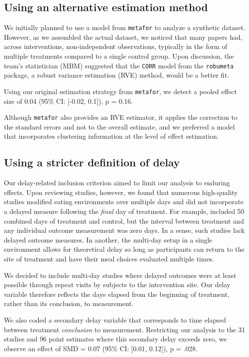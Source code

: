 \documentclass[sn-nature,referee,pdflatex]{sn-jnl}
\begin{document}
\subsection{Using an alternative estimation
method}\label{using-an-alternative-estimation-method}

We initially planned to use a model from \texttt{metafor} to analyze a
synthetic dataset. However, as we assembled the actual dataset, we
noticed that many papers had, across interventions, non-independent
observations, typically in the form of multiple treatments compared to a
single control group. Upon discussion, the team's statistician (MBM)
suggested that the \texttt{CORR} model from the \texttt{robumeta}
package, a robust variance estimation (RVE) method, would be a better
fit.

Using our original estimation strategy from \texttt{metafor}, we detect
a pooled effect size of 0.04 (95\% CI: {[}-0.02, 0.1{]}), p = 0.16.

Although \texttt{metafor} also provides an RVE estimator, it applies the
correction to the standard errors and not to the overall estimate, and
we preferred a model that incorporates clustering information at the
level of effect estimation.

\subsection{Using a stricter definition of
delay}\label{using-a-stricter-definition-of-delay}

Our delay-related inclusion criterion aimed to limit our analysis to
enduring effects. Upon reviewing studies, however, we found that
numerous high-quality studies modified eating environments over multiple
days and did not incorporate a delayed measure following the
\emph{final} day of treatment. For example, \citep{andersson2021}
included 50 combined days of treatment and control, but the interval
between treatment and any individual outcome measurement was zero days.
In a sense, such studies lack delayed outcome measures. In another, the
multi-day setup in a single environment allows for theoretical delay so
long as participants can return to the site of treatment and have their
meal choices evaluated multiple times.

We decided to include multi-day studies where delayed outcomes were at
least possible through repeat visits by subjects to the intervention
site. Our delay variable therefore reflects the days elapsed from the
beginning of treatment, rather than its conclusion, to measurement.

We also coded a secondary delay variable that corresponds to time
elapsed between treatment \emph{conclusion} to measurement. Restricting
our analysis to the 31 studies and 96 point estimates where this
secondary delay exceeds zero, we observe an effect of SMD = 0.07 (95\%
CI: {[}0.01, 0.12{]}), p = .028.


\end{document}
